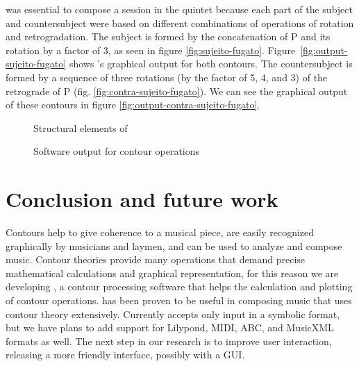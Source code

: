 \goiaba{} was essential to compose a  session in the
quintet because each part of the subject and countersubject were based
on different combinations of operations of rotation and
retrogradation. The subject is formed by the concatenation of P and
its rotation by a factor of 3, as seen in figure
\ref{fig:sujeito-fugato}. Figure~\ref{fig:output-sujeito-fugato} shows
\goiaba{}'s graphical output for both contours. The countersubject is
formed by a sequence of three rotations (by the factor of 5, 4, and 3)
of the retrograde of P (fig. \ref{fig:contra-sujeito-fugato}). We can
see the graphical output of these contours in figure
\ref{fig:output-contra-sujeito-fugato}.

\begin{figure*}
  \centering

  \caption{Structural elements of }
  \label{fig:elementos-fugato}
\end{figure*}

\begin{figure*}
  \centering
  \caption{Software output for  contour operations}
  \label{fig:output-fugato}
\end{figure*}

\section{Conclusion and future work}
\label{sec:conclusion-future-work}

Contours help to give coherence to a musical piece, are easily
recognized graphically by musicians and laymen, and can be used to
analyze and compose music. Contour theories provide many operations
that demand precise mathematical calculations and graphical
representation, for this reason we are developing \goiaba{}, a contour
processing software that helps the calculation and plotting of contour
operations. \goiaba{} has been proven to be useful in composing music
that uses contour theory extensively. Currently \goiaba{} accepts only
input in a symbolic format, but we have plans to add support for
Lilypond, MIDI, ABC, and MusicXML formats as well. The next step in
our research is to improve \goiaba{} user interaction, releasing a
more friendly interface, possibly with a GUI.

